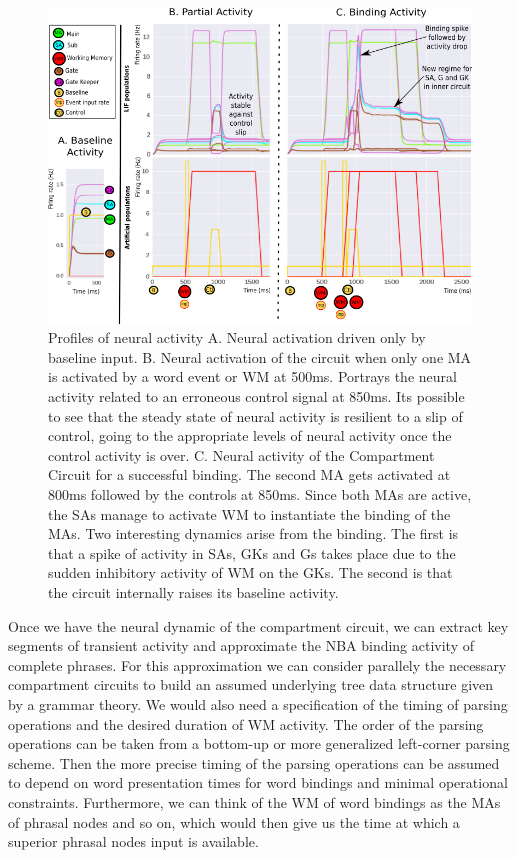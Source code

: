 \documentclass[10pt]{article}
\begin{document}
\begin{figure}[h!]
  \begin{center}
    \includegraphics[width=0.70\columnwidth]{figures/activity_profiles/activity_profiles}
    \caption{{\label{activity_profiles} Profiles of neural activity A.
        Neural activation driven only by baseline input. B. Neural
        activation of the circuit when only one MA is activated by a
        word event or WM at 500ms. Portrays the neural activity
        related to an erroneous control signal at 850ms. Its possible
        to see that the steady state of neural activity is resilient
        to a slip of control, going to the appropriate levels of
        neural activity once the control activity is over. C. Neural
        activity of the Compartment Circuit for a successful binding.
        The second MA gets activated at 800ms followed by the controls
        at 850ms. Since both MAs are active, the SAs manage to
        activate WM to instantiate the binding of the MAs. Two
        interesting dynamics arise from the binding. The first is that
        a spike of activity in SAs, GKs and Gs takes place due to the
        sudden inhibitory activity of WM on the GKs. The second is
        that the circuit internally raises its baseline activity.%
      }}
  \end{center}
\end{figure}

Once we have the neural dynamic of the compartment circuit, we can
extract key segments of transient activity and approximate the NBA
binding activity of complete phrases. For this approximation we can
consider parallely the necessary compartment circuits to build an
assumed underlying tree data structure given by a grammar theory. We
would also need a specification of the timing of parsing operations
and the desired duration of WM activity. The order of the parsing
operations can be taken from a bottom-up or more generalized
left-corner parsing scheme. Then the more precise timing of the
parsing operations can be assumed to depend on word presentation times
for word bindings and minimal operational constraints. Furthermore, we
can think of the WM of word bindings as the MAs of phrasal nodes and
so on, which would then give us the time at which a superior phrasal
nodes input is available.
\end{document}
